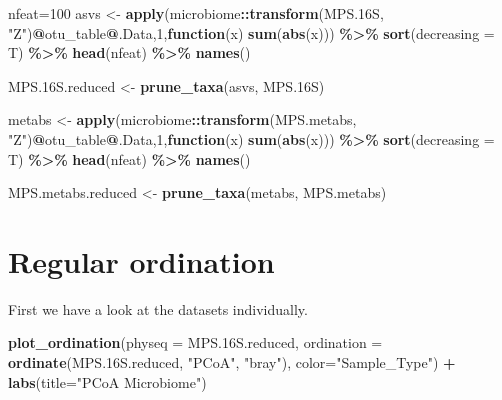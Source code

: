 \documentclass[
]{article}
\newenvironment{Shaded}{\begin{snugshade}}{\end{snugshade}}
\newcommand{\AttributeTok}[1]{\textcolor[rgb]{0.13,0.29,0.53}{#1}}
\newcommand{\ControlFlowTok}[1]{\textcolor[rgb]{0.13,0.29,0.53}{\textbf{#1}}}
\newcommand{\DecValTok}[1]{\textcolor[rgb]{0.00,0.00,0.81}{#1}}
\newcommand{\FloatTok}[1]{\textcolor[rgb]{0.00,0.00,0.81}{#1}}
\newcommand{\FunctionTok}[1]{\textcolor[rgb]{0.13,0.29,0.53}{\textbf{#1}}}
\newcommand{\NormalTok}[1]{#1}
\newcommand{\OtherTok}[1]{\textcolor[rgb]{0.56,0.35,0.01}{#1}}
\newcommand{\SpecialCharTok}[1]{\textcolor[rgb]{0.81,0.36,0.00}{\textbf{#1}}}
\newcommand{\StringTok}[1]{\textcolor[rgb]{0.31,0.60,0.02}{#1}}
\begin{document}
\begin{Shaded}
\begin{Highlighting}[]
\NormalTok{nfeat}\OtherTok{=}\DecValTok{100}
\NormalTok{asvs }\OtherTok{\textless{}{-}} \FunctionTok{apply}\NormalTok{(microbiome}\SpecialCharTok{::}\FunctionTok{transform}\NormalTok{(MPS}\FloatTok{.16}\NormalTok{S, }\StringTok{"Z"}\NormalTok{)}\SpecialCharTok{@}\NormalTok{otu\_table}\SpecialCharTok{@}\NormalTok{.Data,}\DecValTok{1}\NormalTok{,}\ControlFlowTok{function}\NormalTok{(x) }\FunctionTok{sum}\NormalTok{(}\FunctionTok{abs}\NormalTok{(x))) }\SpecialCharTok{\%\textgreater{}\%} \FunctionTok{sort}\NormalTok{(}\AttributeTok{decreasing =}\NormalTok{ T) }\SpecialCharTok{\%\textgreater{}\%} \FunctionTok{head}\NormalTok{(nfeat) }\SpecialCharTok{\%\textgreater{}\%} \FunctionTok{names}\NormalTok{()}

\NormalTok{MPS}\FloatTok{.16}\NormalTok{S.reduced }\OtherTok{\textless{}{-}} \FunctionTok{prune\_taxa}\NormalTok{(asvs, MPS}\FloatTok{.16}\NormalTok{S)}

\NormalTok{metabs }\OtherTok{\textless{}{-}} \FunctionTok{apply}\NormalTok{(microbiome}\SpecialCharTok{::}\FunctionTok{transform}\NormalTok{(MPS.metabs, }\StringTok{"Z"}\NormalTok{)}\SpecialCharTok{@}\NormalTok{otu\_table}\SpecialCharTok{@}\NormalTok{.Data,}\DecValTok{1}\NormalTok{,}\ControlFlowTok{function}\NormalTok{(x) }\FunctionTok{sum}\NormalTok{(}\FunctionTok{abs}\NormalTok{(x))) }\SpecialCharTok{\%\textgreater{}\%} \FunctionTok{sort}\NormalTok{(}\AttributeTok{decreasing =}\NormalTok{ T) }\SpecialCharTok{\%\textgreater{}\%} \FunctionTok{head}\NormalTok{(nfeat) }\SpecialCharTok{\%\textgreater{}\%} \FunctionTok{names}\NormalTok{()}

\NormalTok{MPS.metabs.reduced }\OtherTok{\textless{}{-}} \FunctionTok{prune\_taxa}\NormalTok{(metabs, MPS.metabs)}
\end{Highlighting}
\end{Shaded}

\hypertarget{regular-ordination}{%
\section{Regular ordination}\label{regular-ordination}}

First we have a look at the datasets individually.

\begin{Shaded}
\begin{Highlighting}[]
\FunctionTok{plot\_ordination}\NormalTok{(}\AttributeTok{physeq =}\NormalTok{ MPS}\FloatTok{.16}\NormalTok{S.reduced, }\AttributeTok{ordination =} \FunctionTok{ordinate}\NormalTok{(MPS}\FloatTok{.16}\NormalTok{S.reduced, }\StringTok{"PCoA"}\NormalTok{, }\StringTok{"bray"}\NormalTok{), }\AttributeTok{color=}\StringTok{"Sample\_Type"}\NormalTok{) }\SpecialCharTok{+} 
  \FunctionTok{labs}\NormalTok{(}\AttributeTok{title=}\StringTok{"PCoA Microbiome"}\NormalTok{)}
\end{Highlighting}
\end{Shaded}
\end{document}
